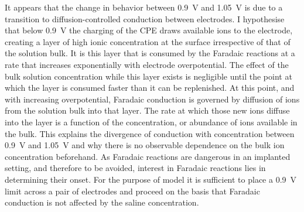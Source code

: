         It appears that the change in behavior between \SI{0.9}{\volt} and \SI{1.05}{\volt} is due to a transition to diffusion-controlled conduction between electrodes.
        I hypothesise that below \SI{0.9}{\volt} the charging of the CPE draws available ions to the electrode, creating a layer of high ionic concentration at the surface irrespective of that of the solution bulk.
        It is this layer that is consumed by the Faradaic reactions at a rate that increases exponentially with electrode overpotential.
        The effect of the bulk solution concentration while this layer exists is negligible until the point at which the layer is consumed faster than it can be replenished.
        At this point, and with increasing overpotential, Faradaic conduction is governed by diffusion of ions from the solution bulk into that layer.
        The rate at which those new ions diffuse into the layer is a function of the concentration, or abundance of ions available in the bulk.
        This explains the divergence of conduction with concentration between \SI{0.9}{\volt} and \SI{1.05}{\volt} and why there is no observable dependence on the bulk ion concentration beforehand.
        As Faradaic reactions are dangerous in an implanted setting, and therefore to be avoided, interest in Faradaic reactions lies in determining their onset.
        For the purpose of model it is sufficient to place a \SI{0.9}{\volt} limit across a pair of electrodes and proceed on the basis that Faradaic conduction is not affected by the saline concentration.

